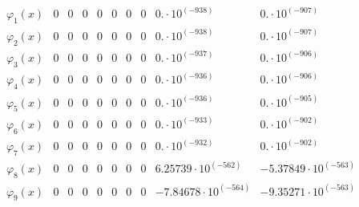 \documentclass{article}
\begin{document}
\begin{landscape}
$$\begin{array}{l|lllllllll}
 \varphi_1(x) & 0 & 0 & 0 & 0 & 0 & 0 & 0 & 0.\cdot 10^{(-938)} & 0.\cdot 10^{(-907)} \\ 
\varphi_2(x) & 0 & 0 & 0 & 0 & 0 & 0 & 0 & 0.\cdot 10^{(-938)} & 0.\cdot 10^{(-907)} \\ 
\varphi_3(x) & 0 & 0 & 0 & 0 & 0 & 0 & 0 & 0.\cdot 10^{(-937)} & 0.\cdot 10^{(-906)} \\ 
\varphi_4(x) & 0 & 0 & 0 & 0 & 0 & 0 & 0 & 0.\cdot 10^{(-936)} & 0.\cdot 10^{(-906)} \\ 
\varphi_5(x) & 0 & 0 & 0 & 0 & 0 & 0 & 0 & 0.\cdot 10^{(-936)} & 0.\cdot 10^{(-905)} \\ 
\varphi_6(x) & 0 & 0 & 0 & 0 & 0 & 0 & 0 & 0.\cdot 10^{(-933)} & 0.\cdot 10^{(-902)} \\ 
\varphi_7(x) & 0 & 0 & 0 & 0 & 0 & 0 & 0 & 0.\cdot 10^{(-932)} & 0.\cdot 10^{(-902)} \\ 
\varphi_8(x) & 0 & 0 & 0 & 0 & 0 & 0 & 0 & 6.25739\cdot 10^{(-562)} & -5.37849\cdot 10^{(-563)} \\ 
\varphi_9(x) & 0 & 0 & 0 & 0 & 0 & 0 & 0 & -7.84678\cdot 10^{(-564)} & -9.35271\cdot 10^{(-563)} \\ 
\end{array} $$ 
\end{landscape} 
\end{document}
